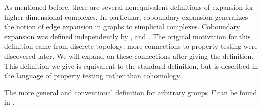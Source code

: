 As mentioned before, there are several nonequivalent definitions of expansion for higher-dimensional complexes. In particular, coboundary expansion generalizes the notion of edge expansion in graphs to simplicial complexes. 
Coboundary expansion was defined independently by \cite{LinialM2006},\cite{MeshulamW2009} and \cite{Gromov2010}. The original motivation for this definition came from discrete topology; more connections to property testing were discovered later. We will expand on these connections after giving the definition. This definition we give is equivalent to the standard definition, but is described in the language of property testing rather than cohomology.

The more general and conventional definition for arbitrary groups $\Gamma$ can be found in . 

% 
    
